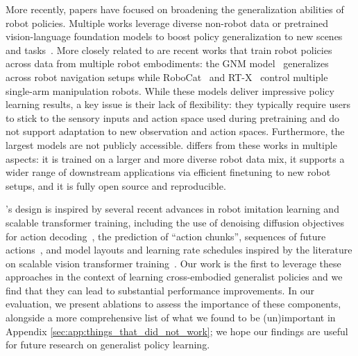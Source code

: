 More recently, papers have focused on broadening the generalization abilities of robot policies. Multiple works leverage diverse non-robot data or pretrained vision-language foundation models to boost policy generalization to new scenes and tasks~\citep{stone2023open,zitkovich2023rt,yu2023scaling,chen2023genaug,huang2023voxposer,ahn2022can,singh2023progprompt,huang2023visual,bahl2023affordances,huang23avlmaps,black2023zero,bahl2022human,kwon2023language,chen2024vision,driess2023palm}. More closely related to \method{} are recent works that train robot policies across data from multiple robot embodiments: the GNM model~\citep{shah2023vint,shahGNMGeneralNavigation2023}
generalizes across robot navigation setups while RoboCat~\citep{bousmalis2023robocat} and RT-X~\cite{open_x_embodiment_rt_x_2023} control multiple single-arm manipulation robots. While these models deliver impressive policy learning results, a key issue is their lack of flexibility: they typically require users to stick to the sensory inputs and action space used during pretraining and do not support adaptation to new observation and action spaces. Furthermore, the largest models are not publicly accessible. \method{} differs from these works in multiple aspects: it is trained on a larger and more diverse robot data mix, it supports a wider range of downstream applications via efficient finetuning to new robot setups, and it is fully open source and reproducible.

\method{}'s design is inspired by several recent advances in robot imitation learning and scalable transformer training, including the use of denoising diffusion objectives~\citep{ho2020denoising} for action decoding~\citep{chi2023diffusionpolicy,ha2023scaling,sridhar2023nomad}, the prediction of ``action chunks'', \ie sequences of future actions~\citep{zhao2023learning,chi2023diffusionpolicy,fu2024mobile}, and model layouts and learning rate schedules inspired by the literature on scalable vision transformer training~\citep{dosovitskiy2020image,zhai2022scaling}. Our work is the first to leverage these approaches in the context of learning cross-embodied generalist policies and we find that they can lead to substantial performance improvements. In our evaluation, we present ablations to assess the importance of these components, alongside a more comprehensive list of what we found to be (un)important in Appendix \ref{sec:app:things_that_did_not_work}; we hope our findings are useful for future research on generalist policy learning.

